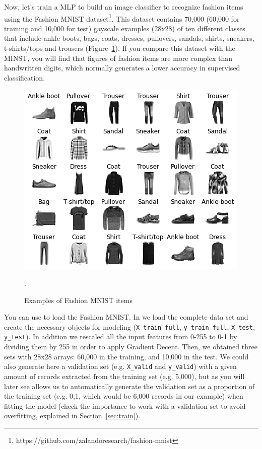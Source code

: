 Now, let's train a MLP to build an image classifier to recognize fashion items using the Fashion MNIST dataset\footnote{https://github.com/zalandoresearch/fashion-mnist}. This dataset contains 70,000 (60,000 for training and 10,000 for test) gayscale examples (28x28) of ten different classes that include ankle boots, bags, coats, dresses, pullovers, sandals, shirts, sneakers, t-shirts/tops and trousers (Figure~\ref{fig:fashion}). If you compare this dataset with the MINST, you will find that figures of fashion items are more complex than handwritten digits, which normally generates a lower accuracy in supervised classification.

\begin{figure}
\centering
\includegraphics[width=0.9\linewidth]{figures/ch15_fashion.png}
\caption{Examples of Fashion MNIST items}.
\label{fig:fashion}
\end{figure}

You can use  to load the Fashion MNIST. In  we load the complete data set and create the necessary objects for modeling (\texttt{X\_train\_full}, \texttt{y\_train\_full}, \texttt{X\_test}, \texttt{y\_test}). In addition we rescaled all the input features from 0-255 to 0-1 by dividing them by 255 in order to apply Gradient Decent. Then, we obtained three sets with 28x28 arrays: 60,000 in the training, and 10,000 in the test. We could also generate here a validation set (e.g. \texttt{X\_valid} and \texttt{y\_valid}) with a given amount of records extracted from the training set (e.g. 5,000), but as you will later see   allows us to automatically generate the validation set as a proportion of the training set (e.g. 0,1, which would be 6,000 records in our example) when fitting the model (check the importance to work with a validation set to avoid overfitting, explained in Section~\ref{sec:train}).

